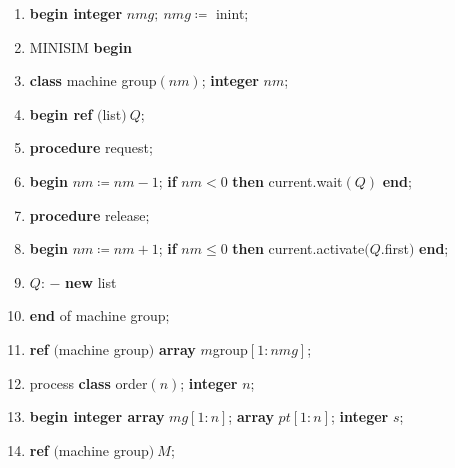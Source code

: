 \begin{enumerate}[nosep, label=\arabic*.]
	\label{pg:program-job-shop}
	
	\item \label{pg:program-job-shop-1}
	\textbf{begin integer} $nmg;\ nmg \coloneq$ inint;
	 
	\item MINISIM \textbf{begin}
	
	\item \label{pg:program-job-shop-3}
	\textbf{class} machine group$(nm)$; \textbf{integer} $nm$;
	
	\item \label{pg:program-job-shop-4}
	\textbf{begin ref} $($list$)\ Q$;
	
	\item \label{pg:program-job-shop-5}
	\quad \textbf{procedure} request;
	
	\item \label{pg:program-job-shop-6}
	\quad \textbf{begin} $nm \coloneq nm - 1$; \textbf{if} $nm < 0$ \textbf{then} current.wait$(Q)$ \textbf{end};
	
	\item \label{pg:program-job-shop-7}
	\quad \textbf{procedure} release;
	
	\item \label{pg:program-job-shop-8}
	\quad \textbf{begin} $nm \coloneq nm + 1$; \textbf{if} $nm \leqslant 0$ \textbf{then} current.activate$(Q$.first$)$ \textbf{end};
	
	\item \label{pg:program-job-shop-9}
	\quad $Q$: $-$ \textbf{new} list
	
	\item \label{pg:program-job-shop-10}
	\textbf{end} of machine group;
	
	\item \label{pg:program-job-shop-11}
	\textbf{ref} $($machine group$)$ \textbf{array} $m$group$[1:nmg]$;
	
	\item \label{pg:program-job-shop-12}
	process \textbf{class} order$(n)$; \textbf{integer} $n$;
	
	\item \label{pg:program-job-shop-13}
	\textbf{begin integer array} $mg[1:n]$; \textbf{array} $pt[1:n]$; \textbf{integer} $s$;
	
	\item \label{pg:program-job-shop-14}
	\quad \textbf{ref} $($machine group$)\ M$;
	

\end{enumerate}
